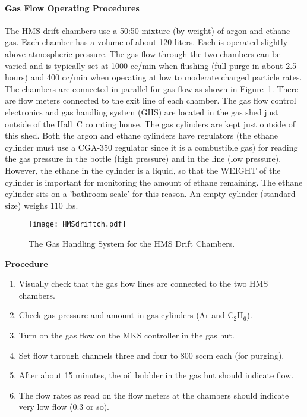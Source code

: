 \paragraph {Gas Flow Operating Procedures}

The HMS drift chambers use a 50:50 mixture (by weight) of argon and
ethane gas.  Each chamber has a volume of about 120 liters.  Each is
operated slightly above atmospheric pressure.  The gas flow through
the two chambers can be varied and is typically set at 1000 cc/min
when flushing (full purge in about 2.5 hours) and 400 cc/min when operating
at low to moderate charged particle rates.  The chambers are connected
in parallel for gas flow as shown in Figure~\ref{fig:5.1}.  There are flow meters 
connected
to the exit line of each chamber.  The gas flow control electronics
and gas handling system (GHS) are located in the gas shed just outside
of the Hall~C counting house.  The gas cylinders are kept just outside of
this shed.  Both the argon and ethane cylinders have regulators (the ethane
cylinder must use a CGA-350 regulator since it is a combustible gas) for
reading the gas pressure in the bottle (high pressure) and in the line (low
pressure).  However, the ethane
in the cylinder is a liquid, so that the WEIGHT of the cylinder is important
for monitoring the amount of ethane remaining.  The ethane
cylinder sits on a 'bathroom scale' for this reason.  An empty cylinder
(standard size) weighs 110 lbs.

\begin{figure}
\texttt{[image: HMSdriftch.pdf]}
\caption{The Gas Handling System for the HMS Drift Chambers. \label{fig:5.1}}
\end{figure}

\begin{center}
{\bf Procedure}
\end{center}

\begin{enumerate}
\item {Visually check that the gas flow lines are connected to the two
HMS chambers.}
\item {Check gas pressure and amount in gas cylinders (Ar and C$_2$H$_6$).}
\item {Turn on the gas flow on the MKS controller in the gas hut.}
\item {Set flow through channels three and four to 800 sccm each
(for purging).}
\item {After about 15 minutes, the oil bubbler in the gas hut should
indicate flow.}
\item {The flow rates as read on the flow meters at the chambers should
indicate very low flow (0.3 or so).}
\end{enumerate}


